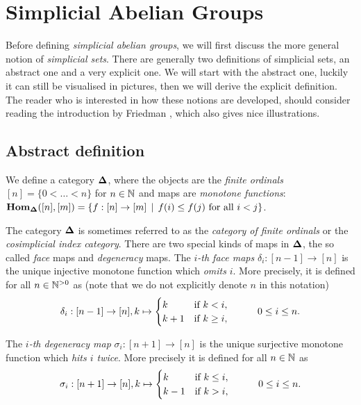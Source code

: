 \section{Simplicial Abelian Groups}
\label{sec:Simplicial Abelian Groups}

Before defining \emph{simplicial abelian groups}, we will first discuss the more general notion of \emph{simplicial sets}. There are generally two definitions of simplicial sets, an abstract one and a very explicit one. We will start with the abstract one, luckily it can still be visualised in pictures, then we will derive the explicit definition. The reader who is interested in how these notions are developed, should consider reading the introduction by Friedman \cite{friedman}, which also gives nice illustrations.

\subsection{Abstract definition}
\begin{definition}
	We define a category $\mathbf{\Delta}$, where the objects are the \emph{finite ordinals} $[n] = \{0 < \dots < n\}$ for $n \in \mathbb{N}$ and maps are \emph{monotone functions}: $\mathbf{Hom}_{\mathbf{\Delta}}([n], [m]) = \{ f : [n] \to [m] \,\mid\, f(i) \leq f(j) \text{ for all } i < j \}$.
\end{definition}

The category $\mathbf{\Delta}$ is sometimes referred to as the \emph{category of finite ordinals} or the \emph{cosimplicial index category}. There are two special kinds of maps in $\mathbf{\Delta}$, the so called \emph{face} maps and \emph{degeneracy} maps. The \emph{$i$-th face maps} $\delta_i: [n-1] \to [n]$ is the unique injective monotone function which \emph{omits} $i$. More precisely, it is defined for all $n \in {\mathbb{N}^{>0}}$ as (note that we do not explicitly denote $n$ in this notation)
$$ \delta_i: [n-1] \to [n], k \mapsto \begin{cases} k & \text{if } k < i,\\ k+1 & \text{if } k \geq i, \end{cases} \hspace{1.0cm} 0 \leq i \leq n. $$

The \emph{$i$-th degeneracy map} $\sigma_i: [n+1] \to [n]$ is the unique surjective monotone function which \emph{hits $i$ twice}. More precisely it is defined for all $n \in \mathbb{N}$ as
$$ \sigma_i: [n+1] \to [n], k \mapsto \begin{cases} k & \text{if } k \leq i,\\ k-1 & \text{if } k > i, \end{cases} \hspace{1.0cm} 0 \leq i \leq n. $$

